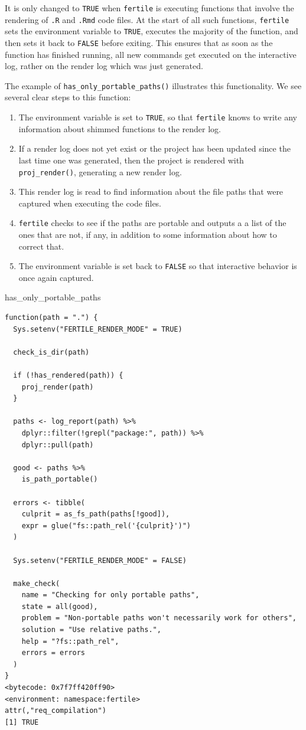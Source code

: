 \documentclass[12pt,twoside]{reedthesis}
\newenvironment{Shaded}{\begin{snugshade}}{\end{snugshade}}
\newcommand{\NormalTok}[1]{#1}
\begin{document}
It is only changed to \texttt{TRUE} when \texttt{fertile} is executing functions that involve the rendering of \texttt{.R} and \texttt{.Rmd} code files. At the start of all such functions, \texttt{fertile} sets the environment variable to \texttt{TRUE}, executes the majority of the function, and then sets it back to \texttt{FALSE} before exiting. This ensures that as soon as the function has finished running, all new commands get executed on the interactive log, rather on the render log which was just generated.

The example of \texttt{has\_only\_portable\_paths()} illustrates this functionality. We see several clear steps to this function:
\begin{enumerate}
\def\labelenumi{\arabic{enumi}.}
\item
  The environment variable is set to \texttt{TRUE}, so that \texttt{fertile} knows to write any information about shimmed functions to the render log.
\item
  If a render log does not yet exist or the project has been updated since the last time one was generated, then the project is rendered with \texttt{proj\_render()}, generating a new render log.
\item
  This render log is read to find information about the file paths that were captured when executing the code files.
\item
  \texttt{fertile} checks to see if the paths are portable and outputs a a list of the ones that are not, if any, in addition to some information about how to correct that.
\item
  The environment variable is set back to \texttt{FALSE} so that interactive behavior is once again captured.
\end{enumerate}
\begin{Shaded}
\begin{Highlighting}[]
\NormalTok{has\_only\_portable\_paths}
\end{Highlighting}
\end{Shaded}
\begin{verbatim}
function(path = ".") {
  Sys.setenv("FERTILE_RENDER_MODE" = TRUE)

  check_is_dir(path)

  if (!has_rendered(path)) {
    proj_render(path)
  }

  paths <- log_report(path) %>%
    dplyr::filter(!grepl("package:", path)) %>%
    dplyr::pull(path)

  good <- paths %>%
    is_path_portable()

  errors <- tibble(
    culprit = as_fs_path(paths[!good]),
    expr = glue("fs::path_rel('{culprit}')")
  )

  Sys.setenv("FERTILE_RENDER_MODE" = FALSE)

  make_check(
    name = "Checking for only portable paths",
    state = all(good),
    problem = "Non-portable paths won't necessarily work for others",
    solution = "Use relative paths.",
    help = "?fs::path_rel",
    errors = errors
  )
}
<bytecode: 0x7f7ff420ff90>
<environment: namespace:fertile>
attr(,"req_compilation")
[1] TRUE
\end{verbatim}
\end{document}
